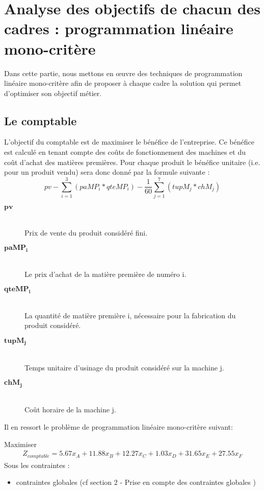 \documentclass[12pt]{article}
\begin{document}
\section{Analyse des objectifs de chacun des cadres : programmation linéaire mono-critère}
Dans cette partie, nous mettons en œuvre des techniques de programmation linéaire mono-critère afin de proposer à chaque cadre la solution qui permet d'optimiser son objectif métier.
\subsection{Le comptable}
L'objectif du comptable est de maximiser le bénéfice de l'entreprise. Ce bénéfice est calculé en tenant compte des coûts de fonctionnement des machines et du coût d'achat des matières premières. Pour chaque produit le bénéfice unitaire (i.e. pour un produit vendu) sera donc donné par la formule suivante : 
\begin{equation*} 
pv - \sum_{i=1}^{3}(paMP_{i} * qteMP_{i}) - \frac{1}{60} \sum_{j=1}^{7}(tupM_{j} * chM_{j})  
\end{equation*}
\begin{description}
\item[$\boldsymbol{pv}$]\hfill \\Prix de vente du produit considéré fini.
\item[$\boldsymbol{paMP_{i}}$]\hfill \\ Le prix d'achat de la matière première de numéro i.
\item[$\boldsymbol{qteMP_{i}}$]\hfill \\ La quantité de matière première i, nécessaire pour la fabrication du produit considéré.
\item[$\boldsymbol{tupM_{j}}$]\hfill \\ Temps unitaire d'usinage du produit considéré sur la machine j.
\item[$\boldsymbol{chM_{j}}$]\hfill \\ Coût horaire de la machine j.
\end{description}
Il en ressort le problème de programmation linéaire mono-critère suivant:
\begin{tcolorbox}
Maximiser
\begin{align*}
Z_{comptable}= 5.67x_{A} +11.88x_{B} +12.27x_{C} +1.03x_{D} +31.65x_{E} +27.55x_{F}
\end{align*}
Sous les contraintes :
\begin{itemize}
\item contraintes globales (cf section 2 - Prise en compte des contraintes globales )
\end{itemize}
\end{tcolorbox}
\end{document}
